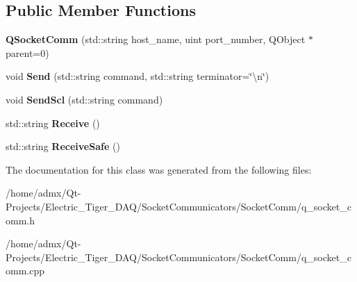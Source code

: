 \subsection*{Public Member Functions}
\begin{DoxyCompactItemize}
\item 
\hypertarget{class_q_socket_comm_afe66e31a1196650b60883380ae7dd141}{{\bfseries Q\+Socket\+Comm} (std\+::string host\+\_\+name, uint port\+\_\+number, Q\+Object $\ast$parent=0)}\label{class_q_socket_comm_afe66e31a1196650b60883380ae7dd141}

\item 
\hypertarget{class_q_socket_comm_a6642ec94f586abdb30dfe0c0532b3bca}{void {\bfseries Send} (std\+::string command, std\+::string terminator=\char`\"{}\textbackslash{}n\char`\"{})}\label{class_q_socket_comm_a6642ec94f586abdb30dfe0c0532b3bca}

\item 
\hypertarget{class_q_socket_comm_a900132260caef9b4e8b959350a5dfd06}{void {\bfseries Send\+Scl} (std\+::string command)}\label{class_q_socket_comm_a900132260caef9b4e8b959350a5dfd06}

\item 
\hypertarget{class_q_socket_comm_af3bd1b626085af405bd27dacf54950e1}{std\+::string {\bfseries Receive} ()}\label{class_q_socket_comm_af3bd1b626085af405bd27dacf54950e1}

\item 
\hypertarget{class_q_socket_comm_a7e695332f9bca48a446bf446bd59acda}{std\+::string {\bfseries Receive\+Safe} ()}\label{class_q_socket_comm_a7e695332f9bca48a446bf446bd59acda}

\end{DoxyCompactItemize}


The documentation for this class was generated from the following files\+:\begin{DoxyCompactItemize}
\item 
/home/admx/\+Qt-\/\+Projects/\+Electric\+\_\+\+Tiger\+\_\+\+D\+A\+Q/\+Socket\+Communicators/\+Socket\+Comm/q\+\_\+socket\+\_\+comm.\+h\item 
/home/admx/\+Qt-\/\+Projects/\+Electric\+\_\+\+Tiger\+\_\+\+D\+A\+Q/\+Socket\+Communicators/\+Socket\+Comm/q\+\_\+socket\+\_\+comm.\+cpp\end{DoxyCompactItemize}
